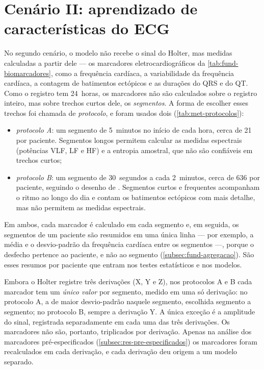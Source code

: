 \FloatBarrier

\section{Cenário II: aprendizado de características do ECG}
\label{sec:res-cenario2}
\label{sec:res-marcadores}

No segundo cenário, o modelo não recebe o sinal do Holter, mas medidas
calculadas a partir dele --- os marcadores eletrocardiográficos da
\autoref{tab:fund-biomarcadores}, como a frequência cardíaca, a
variabilidade da frequência cardíaca, a contagem de batimentos ectópicos e
as durações do QRS e do QT. Como o registro tem 24~horas, os marcadores não
são calculados sobre o registro inteiro, mas sobre trechos curtos dele, os
\textit{segmentos}. A forma de escolher esses trechos foi chamada de
\textit{protocolo}, e foram usados dois (\autoref{tab:met-protocolos}):

\begin{itemize}
	\item \textit{protocolo A}: um segmento de 5~minutos no início de cada
	hora, cerca de 21 por paciente. Segmentos longos permitem calcular as
	medidas espectrais (potências VLF, LF e HF) e a entropia amostral, que
	não são confiáveis em trechos curtos;
	\item \textit{protocolo B}: um segmento de 30~segundos a cada 2~minutos,
	cerca de 636 por paciente, seguindo o desenho de
	. Segmentos curtos e frequentes
	acompanham o ritmo ao longo do dia e contam os batimentos ectópicos com
	mais detalhe, mas não permitem as medidas espectrais.
\end{itemize}

\noindent
Em ambos, cada marcador é calculado em cada segmento e, em seguida, os
segmentos de um paciente são resumidos em uma única linha --- por exemplo,
a média e o desvio-padrão da frequência cardíaca entre os segmentos ---,
porque o desfecho pertence ao paciente, e não ao segmento
(\autoref{subsec:fund-agregacao}). São esses resumos por paciente que
entram nos testes estatísticos e nos modelos.

Embora o Holter registre três derivações (X, Y e Z), nos protocolos A e B
cada marcador tem um \textit{único valor} por segmento, medido em uma só
derivação: no protocolo A, a de maior desvio-padrão naquele segmento,
escolhida segmento a segmento; no protocolo B, sempre a derivação Y. A
única exceção é a amplitude do sinal, registrada separadamente em cada uma
das três derivações. Os marcadores não são, portanto, triplicados por
derivação. Apenas na análise dos marcadores pré-especificados
(\autoref{subsec:res-pre-especificados}) os marcadores foram recalculados
em cada derivação, e cada derivação deu origem a um modelo separado.

